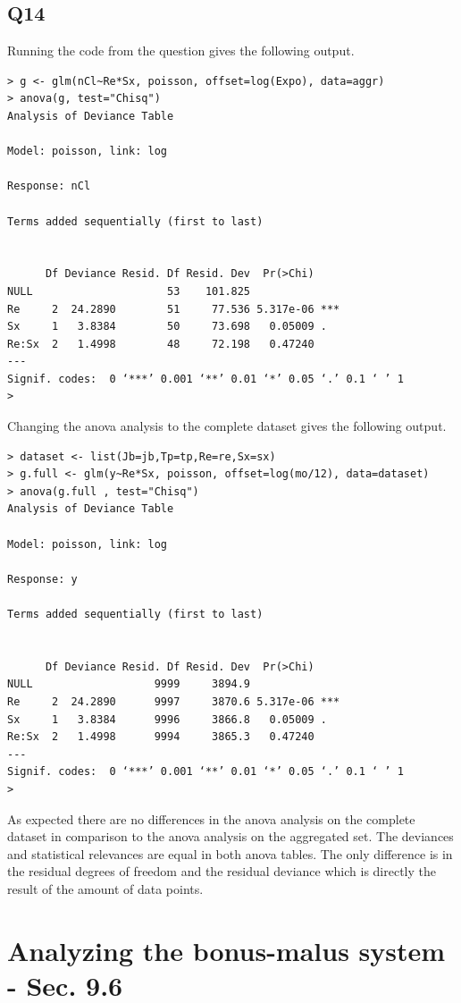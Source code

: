 \documentclass[11pt]{article}
\begin{document}
\subsection*{Q14}

Running the code from the question gives the following output.

\begin{verbatim}
> g <- glm(nCl~Re*Sx, poisson, offset=log(Expo), data=aggr)
> anova(g, test="Chisq")
Analysis of Deviance Table

Model: poisson, link: log

Response: nCl

Terms added sequentially (first to last)


      Df Deviance Resid. Df Resid. Dev  Pr(>Chi)    
NULL                     53    101.825              
Re     2  24.2890        51     77.536 5.317e-06 ***
Sx     1   3.8384        50     73.698   0.05009 .  
Re:Sx  2   1.4998        48     72.198   0.47240    
---
Signif. codes:  0 ‘***’ 0.001 ‘**’ 0.01 ‘*’ 0.05 ‘.’ 0.1 ‘ ’ 1
>
\end{verbatim}

Changing the anova analysis to the complete dataset gives the following output.

\begin{verbatim}
> dataset <- list(Jb=jb,Tp=tp,Re=re,Sx=sx)
> g.full <- glm(y~Re*Sx, poisson, offset=log(mo/12), data=dataset)
> anova(g.full , test="Chisq")
Analysis of Deviance Table

Model: poisson, link: log

Response: y

Terms added sequentially (first to last)


      Df Deviance Resid. Df Resid. Dev  Pr(>Chi)    
NULL                   9999     3894.9              
Re     2  24.2890      9997     3870.6 5.317e-06 ***
Sx     1   3.8384      9996     3866.8   0.05009 .  
Re:Sx  2   1.4998      9994     3865.3   0.47240    
---
Signif. codes:  0 ‘***’ 0.001 ‘**’ 0.01 ‘*’ 0.05 ‘.’ 0.1 ‘ ’ 1
>
\end{verbatim}
As expected there are no differences in the anova analysis on the complete dataset in comparison to the anova analysis on the aggregated set. The deviances and statistical relevances are equal in both anova tables. The only difference is in the residual degrees of freedom and the residual deviance which is directly the result of the amount of data points.

\section{Analyzing the bonus-malus system - Sec. 9.6}
\end{document}
